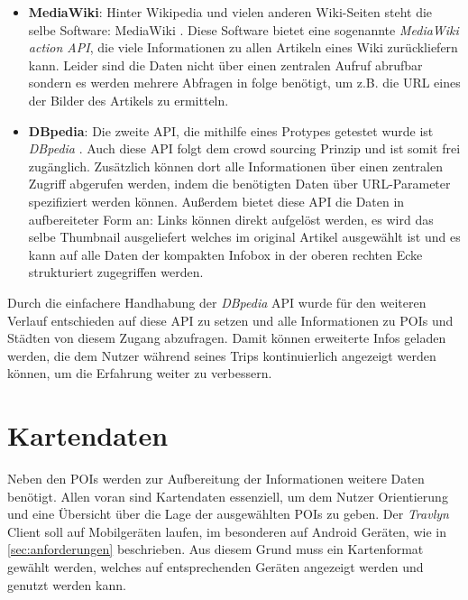 \begin{itemize}
	\item \textbf{MediaWiki}: Hinter Wikipedia und vielen anderen Wiki-Seiten steht die selbe Software: MediaWiki \cite{MediaWiki.24.01.2020}. Diese Software bietet eine sogenannte \textit{MediaWiki action API}, die viele Informationen zu allen Artikeln eines Wiki zurückliefern kann. Leider sind die Daten nicht über einen zentralen Aufruf abrufbar sondern es werden mehrere Abfragen in folge benötigt, um z.B. die URL eines der Bilder des Artikels zu ermitteln.
	\item \textbf{DBpedia}: Die zweite API, die mithilfe eines Protypes getestet wurde ist \textit{DBpedia} \cite{DBpedia.02.02.2020}. Auch diese API folgt dem crowd sourcing Prinzip und ist somit frei zugänglich. Zusätzlich können dort alle Informationen über einen zentralen Zugriff abgerufen werden, indem die benötigten Daten über URL-Parameter spezifiziert werden können. Außerdem bietet diese API die Daten in aufbereiteter Form an: Links können direkt aufgelöst werden, es wird das selbe Thumbnail ausgeliefert welches im original Artikel ausgewählt ist und es kann auf alle Daten der kompakten Infobox in der oberen rechten Ecke strukturiert zugegriffen werden.
\end{itemize}

Durch die einfachere Handhabung der \textit{DBpedia} API wurde für den weiteren Verlauf entschieden auf diese API zu setzen und alle Informationen zu POIs und Städten von diesem Zugang abzufragen. Damit können erweiterte Infos geladen werden, die dem Nutzer während seines Trips kontinuierlich angezeigt werden können, um die Erfahrung weiter zu verbessern.

\section{Kartendaten}

Neben den \acs{POI}s werden zur Aufbereitung der Informationen weitere Daten benötigt. Allen voran sind Kartendaten essenziell, um dem Nutzer Orientierung und eine Übersicht über die Lage der ausgewählten \acs{POI}s zu geben. Der \textit{Travlyn} Client soll auf Mobilgeräten laufen, im besonderen auf Android Geräten, wie in \autoref{sec:anforderungen} beschrieben. Aus diesem Grund muss ein Kartenformat gewählt werden, welches auf entsprechenden Geräten angezeigt werden und genutzt werden kann.

\vspace{0.25cm}

